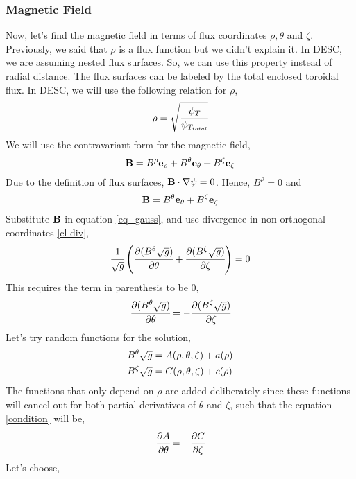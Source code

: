 \subsubsection{Magnetic Field}
Now, let's find the magnetic field in terms of flux coordinates $\rho, \theta$ and $\zeta$. Previously, we said that $\rho$ is a flux function but we didn't explain it. In DESC, we are assuming nested flux surfaces. So, we can use this property instead of radial distance. The flux surfaces can be labeled by the total enclosed toroidal flux. In DESC, we will use the following relation for $\rho$,
\begin{equation}
    \rho = \sqrt{\cfrac{\psi_T}{\psi_{T_{total}}}} \label{def_rho}
\end{equation}
We will use the contravariant form for the magnetic field,
\begin{equation}
    \mathbf{B} = B^\rho \mathbf{e}_\rho + B^\theta \mathbf{e}_\theta + B^\zeta \mathbf{e}_\zeta
\end{equation}
Due to the definition of flux surfaces, $\mathbf{B}\cdot\nabla\psi = 0$. Hence, $B^\rho = 0$ and 
\begin{equation}
    \mathbf{B} = B^\theta \mathbf{e}_\theta + B^\zeta \mathbf{e}_\zeta   \label{B_general}
\end{equation}
Substitute $\mathbf{B}$ in equation \ref{eq_gauss}, and use divergence in non-orthogonal coordinates \ref{cl-div},
\begin{equation}
    \cfrac{1}{\sqrt{g}}\left(\cfrac{\partial(B^\theta\sqrt{g})}{\partial\theta} + \cfrac{\partial(B^\zeta\sqrt{g})}{\partial\zeta}\right) = 0
\end{equation}
This requires the term in parenthesis to be 0,
\begin{equation}
    \cfrac{\partial(B^\theta\sqrt{g})}{\partial\theta} = - \cfrac{\partial(B^\zeta\sqrt{g})}{\partial\zeta}  \label{condition}
\end{equation}
Let's try random functions for the solution,
\begin{align}
    B^\theta\sqrt{g} &= A(\rho,\theta,\zeta) + a(\rho) \\
    B^\zeta\sqrt{g}  &= C(\rho,\theta,\zeta) + c(\rho)
\end{align}
The functions that only depend on $\rho$ are added deliberately since these functions will cancel out for both partial derivatives of $\theta$ and $\zeta$, such that the equation \ref{condition} will be, 
\begin{equation}
    \cfrac{\partial A}{\partial\theta} = - \cfrac{\partial C}{\partial\zeta}
\end{equation}
Let's choose,
